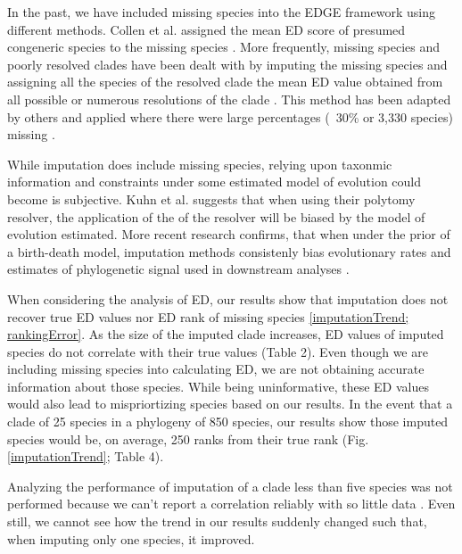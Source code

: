 \documentclass[12pt,english]{article}
\begin{document}

In the past, we have included missing species into the EDGE framework using
different methods. Collen et al. assigned the mean ED score of presumed
congeneric species to the missing species \citeyear{Collen2011}. More
frequently, missing species and poorly resolved clades have been dealt with by
imputing the missing species and assigning all the species of the resolved clade
the mean ED value obtained from all possible or numerous resolutions of the
clade \autocite{Isaac2007; Isaac2012}. This method has been adapted by others
and applied where there were large percentages (~30\% or 3,330 species) missing
\autocite{Jetz2014}. 

While imputation does include missing species, relying upon taxonmic information
and constraints under some estimated model of evolution could become is
subjective. Kuhn et al. \citeyear{2011} suggests that when using their polytomy
resolver, the application of the of the resolver will be biased by the model of
evolution estimated. More recent research confirms, that when under the prior of
a birth-death model, imputation methods consistenly bias evolutionary rates and
estimates of phylogenetic signal used in downstream analyses
\autocite{Rabosky2014}. 

When considering the analysis of ED, our results show that imputation does not
recover true ED values nor ED rank of missing species \ref{imputationTrend;
rankingError}. As the size of the imputed clade increases, ED values of imputed
species do not correlate with their true values (Table 2). Even though we are
including missing species into calculating ED, we are not obtaining accurate
information about those species. While being uninformative, these ED values
would also lead to mispriortizing species based on our results. In the event
that a clade of 25 species in a phylogeny of 850 species, our results show those
imputed species would be, on average, 250 ranks from their true rank (Fig.
\ref{imputationTrend}; Table 4). 

Analyzing the performance of imputation of a clade less than five species was
not performed because we can't report a correlation reliably with so little data
\autocite{Crawley2012}. Even still, we cannot see how the trend in our results
suddenly changed such that, when imputing only one species, it improved.
\end{document}

